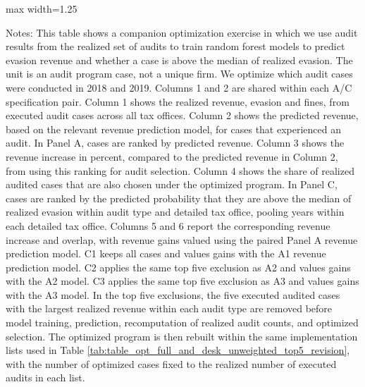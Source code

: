 \documentclass{article}
\newcommand{\OutPath}{Output/}%
\newcommand{\OutPath}{../Output/}%
\begin{document}
\begin{landscape}
\begin{table}[H]\centering
\begin{adjustbox}{max width=1.25\textwidth}
\begin{threeparttable}
\caption{Optimization Gains from Machine-Learning Algorithm Trained on Audit Outcome Data: Predicted Above-Median Evasion}
\label{tab:table_opt_full_and_desk_bin_target_panelc}

\footnotesize


\begin{tablenotes}[flushleft]
\footnotesize
\item Notes: This table shows a companion optimization exercise in which we use audit results from the realized set of audits to train random forest models to predict evasion revenue and whether a case is above the median of realized evasion. The unit is an audit program case, not a unique firm. We optimize which audit cases were conducted in 2018 and 2019. Columns 1 and 2 are shared within each A/C specification pair. Column 1 shows the realized revenue, evasion and fines, from executed audit cases across all tax offices. Column 2 shows the predicted revenue, based on the relevant revenue prediction model, for cases that experienced an audit. In Panel A, cases are ranked by predicted revenue. Column 3 shows the revenue increase in percent, compared to the predicted revenue in Column 2, from using this ranking for audit selection. Column 4 shows the share of realized audited cases that are also chosen under the optimized program. In Panel C, cases are ranked by the predicted probability that they are above the median of realized evasion within audit type and detailed tax office, pooling years within each detailed tax office. Columns 5 and 6 report the corresponding revenue increase and overlap, with revenue gains valued using the paired Panel A revenue prediction model. C1 keeps all cases and values gains with the A1 revenue prediction model. C2 applies the same top five exclusion as A2 and values gains with the A2 model. C3 applies the same top five exclusion as A3 and values gains with the A3 model. In the top five exclusions, the five executed audited cases with the largest realized revenue within each audit type are removed before model training, prediction, recomputation of realized audit counts, and optimized selection. The optimized program is then rebuilt within the same implementation lists used in Table \ref{tab:table_opt_full_and_desk_unweighted_top5_revision}, with the number of optimized cases fixed to the realized number of executed audits in each list.
\end{tablenotes}
\end{threeparttable}
\end{adjustbox}
\end{table}
\end{landscape}
\end{document}
